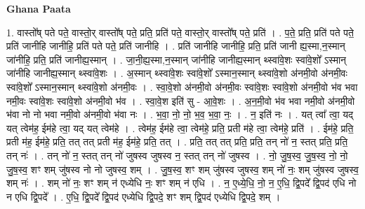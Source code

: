 \documentclass[17pt]{extarticle}
\begin{document}
\textbf{Ghana Paata } \newline

1. वास्तो᳚ष् पते पते॒ वास्तो॒र् वास्तो᳚ष् पते॒ प्रति॒ प्रति॑ पते॒ वास्तो॒र् वास्तो᳚ष् पते॒ प्रति॑ । . प॒ते॒ प्रति॒ प्रति॑ पते पते॒ प्रति॑ जानीहि जानीहि॒ प्रति॑ पते पते॒ प्रति॑ जानीहि । . प्रति॑ जानीहि जानीहि॒ प्रति॒ प्रति॑ जानी ह्य॒स्मा,न॒स्मान् जा॑नीहि॒ प्रति॒ प्रति॑ जानीह्य॒स्मान् । . जा॒नी॒ह्य॒स्मा,न॒स्मान् जा॑नीहि जानीह्य॒स्मान् थ्स्वा॑वे॒शः स्वा॑वे॒शो᳚ ऽस्मान् जा॑नीहि जानीह्य॒स्मान् थ्स्वा॑वे॒शः । . अ॒स्मान् थ्स्वा॑वे॒शः स्वा॑वे॒शो᳚ ऽस्मान॒स्मान् थ्स्वा॑वे॒शो अ॑नमी॒वो अ॑नमी॒वः स्वा॑वे॒शो᳚ ऽस्मान॒स्मान् थ्स्वा॑वे॒शो अ॑नमी॒वः । . स्वा॒वे॒शो अ॑नमी॒वो अ॑नमी॒वः स्वा॑वे॒शः स्वा॑वे॒शो अ॑नमी॒वो भ॑व भवा नमी॒वः स्वा॑वे॒शः स्वा॑वे॒शो अ॑नमी॒वो भ॑व । . स्वा॒वे॒श इति॑ सु - आ॒वे॒शः । . अ॒न॒मी॒वो भ॑व भवा नमी॒वो अ॑नमी॒वो भ॑वा नो नो भवा नमी॒वो अ॑नमी॒वो भ॑वा नः । . भ॒वा॒ नो॒ नो॒ भ॒व॒ भ॒वा॒ नः॒ । . न॒ इति॑ नः । . यत् त्वा᳚ त्वा॒ यद् यत् त्वेम॑ह॒ ईम॑हे त्वा॒ यद् यत् त्वेम॑हे । . त्वेम॑ह॒ ईम॑हे त्वा॒ त्वेम॑हे॒ प्रति॒ प्रती म॑हे त्वा॒ त्वेम॑हे॒ प्रति॑ । . ईम॑हे॒ प्रति॒ प्रती म॑ह॒ ईम॑हे॒ प्रति॒ तत् तत् प्रती म॑ह॒ ईम॑हे॒ प्रति॒ तत् । . प्रति॒ तत् तत् प्रति॒ प्रति॒ तन् नो॑ न॒ स्तत् प्रति॒ प्रति॒ तन् नः॑ । . तन् नो॑ न॒ स्तत् तन् नो॑ जुषस्व जुषस्व न॒ स्तत् तन् नो॑ जुषस्व । . नो॒ जु॒ष॒स्व॒ जु॒ष॒स्व॒ नो॒ नो॒ जु॒ष॒स्व॒ शꣳ शम् जु॑षस्व नो नो जुषस्व॒ शम् । . जु॒ष॒स्व॒ शꣳ शम् जु॑षस्व जुषस्व॒ शम् नो॑ नः॒ शम् जु॑षस्व जुषस्व॒ शम् नः॑ । . शम् नो॑ नः॒ शꣳ शम् न॑ एध्येधि नः॒ शꣳ शम् न॑ एधि । . न॒ ए॒ध्ये॒धि॒ नो॒ न॒ ए॒धि॒ द्वि॒पदे᳚ द्वि॒पद॑ एधि नो न एधि द्वि॒पदे᳚ । . ए॒धि॒ द्वि॒पदे᳚ द्वि॒पद॑ एध्येधि द्वि॒पदे॒ शꣳ शम् द्वि॒पद॑ एध्येधि द्वि॒पदे॒ शम् । \newline
\end{document}
